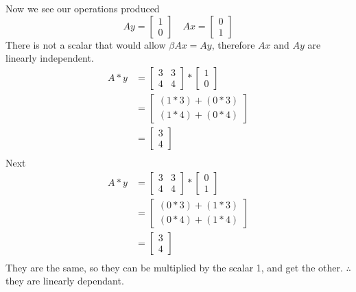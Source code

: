\documentclass{article}
\begin{document}
Now we see our operations produced $$Ay = \begin{bmatrix} 1 \\ 0 \end{bmatrix} \quad Ax = \begin{bmatrix} 0 \\ 1 \end{bmatrix}$$
There is not a scalar that would allow $\beta Ax = Ay$, therefore $Ax$ and $Ay$ are linearly independent. 
\begin{align*}
    A*y &= \begin{bmatrix}
        3 &3 \\
        4 &4
    \end{bmatrix} * \begin{bmatrix}
        1\\ 0
    \end{bmatrix}\\
    &= \begin{bmatrix}
        (1*3) + (0*3)\\
        (1*4) + (0*4)
    \end{bmatrix}\\
    &= \begin{bmatrix}
        3 \\ 4
    \end{bmatrix}\\
\end{align*}
Next
\begin{align*}
    A*y &= \begin{bmatrix}
        3 &3 \\
        4 &4
    \end{bmatrix} * \begin{bmatrix}
        0\\ 1
    \end{bmatrix}\\
    &= \begin{bmatrix}
        (0*3) + (1*3)\\
        (0*4) + (1*4)
    \end{bmatrix}\\
    &= \begin{bmatrix}
        3 \\ 4
    \end{bmatrix}\\
\end{align*}
They are the same, so they can be multiplied by the scalar 1, and get the other. $\therefore$ they are linearly dependant.
\end{document}
